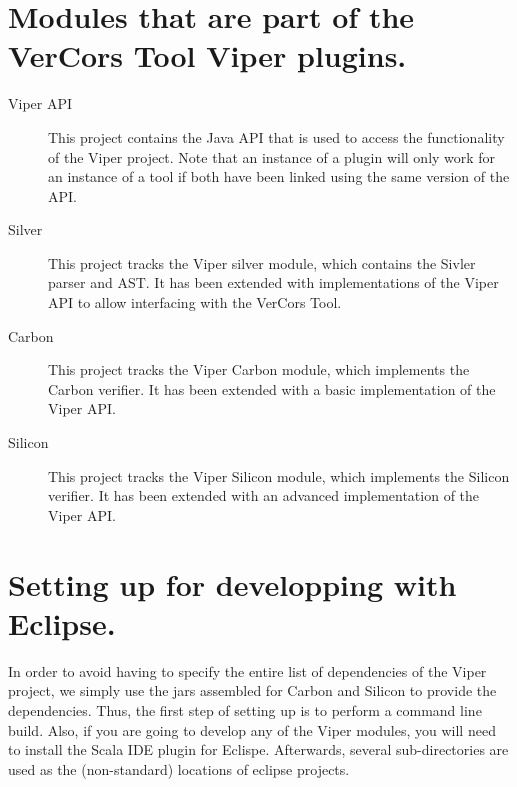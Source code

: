 \section{Modules that are part of the VerCors Tool Viper plugins.}

\begin{description}
\item[Viper API]
This project contains the Java API that is used to access the functionality of the Viper project.
Note that an instance of a plugin will only work for an instance of a tool if both have been
linked using the same version of the API.
\item[Silver]
This project tracks the Viper silver module, which contains the Sivler parser and AST.
It has been extended with implementations of the Viper API to allow interfacing with
the VerCors Tool.
\item[Carbon]
This project tracks the Viper Carbon module, which implements the Carbon verifier.
It has been extended with a basic implementation of the Viper API.
\item[Silicon]
This project tracks the Viper Silicon module, which implements the Silicon verifier.
It has been extended with an advanced implementation of the Viper API.
\end{description}

\section{Setting up for developping with Eclipse.}

In order to avoid having to specify the entire list of dependencies of the Viper project,
we simply use the jars assembled for Carbon and Silicon to provide the dependencies.
Thus, the first step of setting up is to perform a command line build.
Also, if you are going to develop any of the Viper modules, you will
need to install the Scala IDE plugin for Eclispe.
Afterwards, several sub-directories are used as the (non-standard) locations of eclipse projects.


